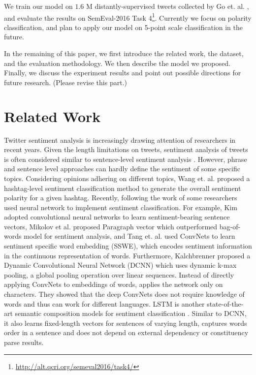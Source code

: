 \documentclass{article} %
\begin{document}
We train our model on $1.6$ M distantly-supervised tweets collected by Go et. al. \cite{go2009twitter}, and evaluate the results on SemEval-2016 Task 4\footnote{\url{http://alt.qcri.org/semeval2016/task4/}}. Currently we focus on polarity classification, and plan to apply our model on 5-point scale classification in the future. 

In the remaining of this paper, we first introduce the related work, the dataset, and the evaluation methodology. We then describe the model we proposed. Finally, we discuss the experiment results and point out possible directions for future research. (Please revise this part.)

\section{Related Work}
Twitter sentiment analysis is increasingly drawing attention of researchers in recent years. 
Given the length limitations on tweets, sentiment analysis of tweets is often considered similar to sentence-level sentiment analysis \cite{kouloumpis2011twitter}.
However, phrase and sentence level approaches can hardly define the sentiment of some specific topics. Considering opinions adhering on different topics, Wang et. al. \cite{wang2011topic} proposed a hashtag-level sentiment classification method  to generate the overall sentiment polarity for a given hashtag.
Recently, following the work of \cite{mikolov2013efficient} some researchers used neural network to implement sentiment classification. 
For example, Kim \cite{kim2014convolutional} adopted convolutional neural networks to learn sentiment-bearing sentence vectors, Mikolov et al. \cite{mikolov2013distributed} proposed Paragraph vector which outperformed bag-of-words model for sentiment analysis, and Tang et. al. \cite{tang2014learning} used ConvNets to learn sentiment specific word embedding (SSWE), which encodes sentiment information in the continuous
representation of words.
Furthermore, Kalchbrenner \cite{kalchbrenner2014convolutional} proposed a Dynamic Convolutional Neural Network (DCNN) which uses dynamic k-max pooling, a global pooling operation over linear sequences.
Instead of directly applying ConvNets to embeddings of words, \cite{zhang2015character} applies the network only on characters. They showed that the deep ConvNets does not require knowledge of words and thus can work for different languages.
LSTM \cite{hochreiter1997long} is another state-of-the-art semantic composition models for sentiment classification \cite{li2015tree}. Similar to DCNN, it also learns fixed-length vectors for sentences of varying length, captures words order in a sentence and does not depend on external dependency or constituency parse results.
\end{document}
